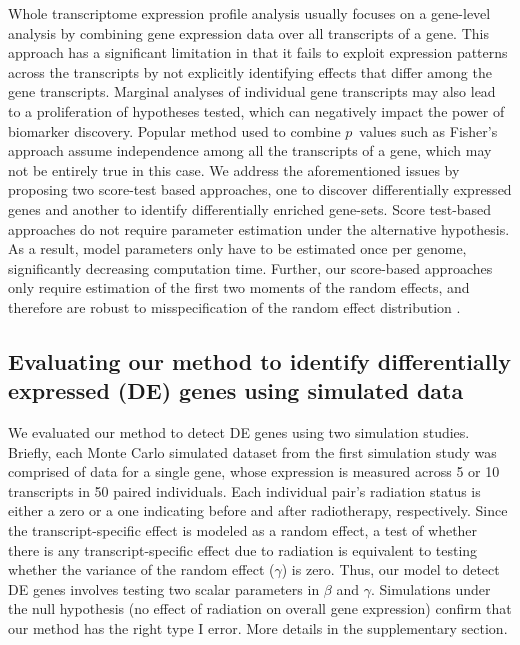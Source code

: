 \documentclass[hidelinks,11pt]{article}
\begin{document}
Whole transcriptome expression profile analysis usually focuses on a gene-level analysis by combining gene expression data over all transcripts of a gene. This approach has a significant limitation in that it fails to exploit expression patterns across the transcripts by not explicitly identifying effects that differ among the gene transcripts. Marginal analyses of individual gene transcripts may also lead to a proliferation of hypotheses tested, which can negatively impact the power of biomarker discovery. Popular method used to combine $p$~values such as Fisher's approach assume independence among all the transcripts of a gene, which may not be entirely true in this case. We address the aforementioned issues by proposing two score-test based approaches, one to discover differentially expressed genes and another to identify differentially enriched gene-sets.  Score test-based approaches do not require parameter estimation under the alternative hypothesis. As a result, model parameters only have to be estimated once per genome, significantly decreasing computation time. Further, our score-based approaches only require estimation of the first two moments of the random effects, and therefore are robust to misspecification of the random effect distribution \cite{xlin_varComp_test}.

\subsection*{Evaluating our method to identify differentially expressed (DE) genes using simulated data}
We evaluated our method to detect DE genes using two simulation studies. Briefly, each Monte Carlo simulated dataset from the first simulation study was comprised of data for a single gene, whose expression is measured across 5 or 10 transcripts in 50 paired individuals. Each individual pair's radiation status is either a zero or a one indicating before and after radiotherapy, respectively. Since the transcript-specific effect is modeled as a random effect, a test of whether there is any transcript-specific effect due to radiation is equivalent to testing whether the variance of the random effect ($\gamma$) is zero. Thus, our model to detect DE genes involves testing two scalar parameters in $\beta$ and $\gamma$. Simulations under the null hypothesis (no effect of radiation on overall gene expression) confirm that our method has the right type I error. More details in the supplementary section. 
\end{document}

